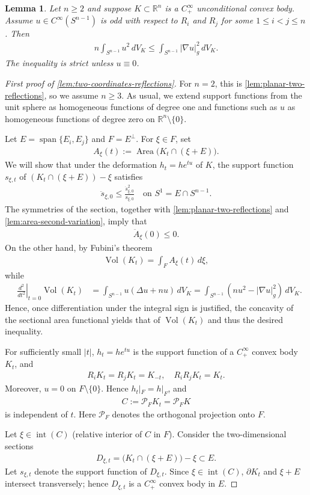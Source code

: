 \documentclass[12pt]{amsart}
\newcommand{\R}{\mathbb{R}}
\newcommand{\Sn}{S^{n-1}}
\newcommand{\abs}[1]{\left|#1\right|}
\newcommand{\eq}[1]{\begin{equation}\begin{alignedat}{2}#1\end{alignedat}\end{equation}}
\theoremstyle{plain}
\newtheorem{lemma}[theorem]{Lemma}
\theoremstyle{definition}
\theoremstyle{remark}
\numberwithin{equation}{section}
\begin{document}
\begin{lemma}\label{lem:two-coordinates-reflections}
Let $n\geq 2$ and suppose $K\subset\R^n$ is a $C^{\infty}_+$ unconditional convex body. Assume $u\in C^{\infty}(\Sn)$ is odd with respect to $R_i$ and $R_j$ for some $1\le i<j\le n$. Then
\eq{
n\int_{\Sn}u^2\,dV_K\le \int_{\Sn}\abs{\nabla u}_g^2\,dV_K.
}
The inequality is strict unless $u\equiv 0$.
\end{lemma}

\begin{proof}[First proof of \autoref{lem:two-coordinates-reflections}]
For $n=2$, this is \autoref{lem:planar-two-reflections}, so we assume $n\geq 3$. As usual, we extend support functions from the unit sphere as homogeneous functions of degree one and functions such as $u$ as homogeneous functions of degree zero on $\R^n\setminus\{0\}$.

Let $E=\operatorname{span}\{E_i,E_j\}$ and $F=E^{\perp}$. For $\xi\in F$, set
\eq{
 A_{\xi}(t):=\operatorname{Area}\big(K_t\cap(\xi+E)\big).
}
We will show that under the deformation $h_t=he^{tu}$ of $K$, the support function $s_{\xi,t}$ of $(K_t\cap(\xi+E))-\xi$ satisfies
\eq{
 \ddot{s}_{\xi,0}\leq \frac{\dot{s}_{\xi,0}^2}{s_{\xi,0}}
 \quad\text{on }S^1=E\cap\Sn.
}
The symmetries of the section, together with \autoref{lem:planar-two-reflections} and \autoref{lem:area-second-variation}, imply that
\eq{
 \ddot{A}_{\xi}(0)\leq 0.
}
On the other hand, by Fubini's theorem
\eq{
 \operatorname{Vol}(K_t)=\int_{F} A_{\xi}(t)\,d\xi,
}
while
\eq{\label{eq:volume-second-variation}
& \left.\frac{d^2}{dt^2}\right|_{t=0}\operatorname{Vol}(K_t)
 &=\int_{\Sn}u(\Delta u+nu)\,dV_K=\int_{\Sn}\left(nu^2-\abs{\nabla u}_g^2\right)\,dV_K.
}
Hence, once differentiation under the integral sign is justified, the concavity of the sectional area functional yields that of $\operatorname{Vol}(K_t)$ and thus the desired inequality.

For sufficiently small $|t|$, $ h_t=he^{tu}$ is the support function of a $C^{\infty}_+$ convex body $K_t$, and
\eq{\label{eq:global-log-symmetries}
 R_iK_t=R_jK_t=K_{-t},\quad R_iR_jK_t=K_t.
}
Moreover, $u=0$ on $F\setminus\{0\}$. Hence $h_t|_{F}=h|_{F}$, and
\eq{
 C:=\mathcal{P}_{F}K_t=\mathcal{P}_{F}K
}
is independent of $t$. Here $\mathcal{P}_{F}$ denotes the orthogonal projection onto $F$.

Let $\xi\in\operatorname{int}(C)$ (relative interior of $C$ in $F$). Consider the two-dimensional sections
\eq{
 D_{\xi,t}=\big(K_t\cap(\xi+E)\big)-\xi\subset E.
}
Let $s_{\xi,t}$ denote the support function of $D_{\xi,t}$. Since $\xi\in\operatorname{int}(C)$, $\partial K_t$ and $\xi+E$ intersect transversely; hence $D_{\xi,t}$ is a $C^{\infty}_+$ convex body in $E$.


\end{proof}
\end{document}
